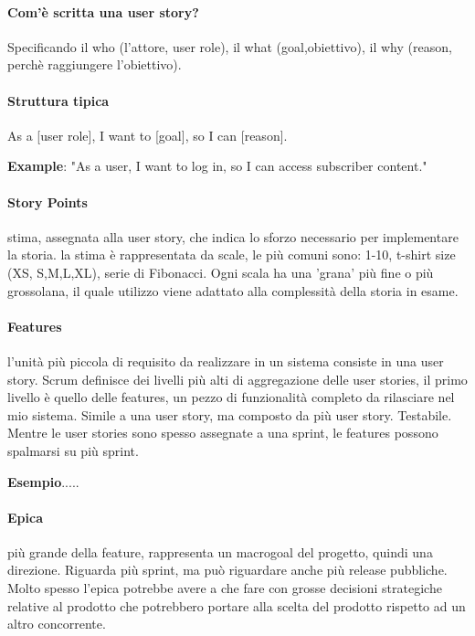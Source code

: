 \documentclass[10pt,a4paper]{book}
\begin{document}
\paragraph{Com'è scritta una user story?} Specificando il who (l'attore, user role), il what (goal,obiettivo), il why (reason, perchè raggiungere l'obiettivo).

\paragraph{Struttura tipica} As a [user role], I want to [goal], so I can [reason].

\textbf{Example}: "As a user, I want to log in, so I can access subscriber content."

\paragraph{Story Points} stima, assegnata alla user story, che indica lo sforzo necessario per implementare la storia.
la stima è rappresentata da scale, le più comuni sono: 1-10, t-shirt size (XS, S,M,L,XL), serie di Fibonacci. Ogni scala ha una 'grana' più fine o più grossolana, il quale utilizzo viene adattato alla complessità della storia in esame.
 
\paragraph{Features} l'unità più piccola di requisito da realizzare in un sistema consiste in una user story. 
Scrum definisce dei livelli più alti di aggregazione delle user stories, il primo livello è quello delle features, un pezzo di funzionalità completo da rilasciare nel mio sistema. Simile a una user story, ma composto da più user story. Testabile. Mentre le user stories sono spesso assegnate a una sprint, le features possono spalmarsi su più sprint.

\textbf{Esempio}.....



\paragraph{Epica} più grande della feature, rappresenta un macrogoal del progetto, quindi una direzione. Riguarda più sprint, ma può riguardare anche più release pubbliche. Molto spesso l'epica potrebbe avere a che fare con grosse decisioni strategiche relative al prodotto che potrebbero portare alla scelta del prodotto rispetto ad un altro concorrente.
\end{document}
